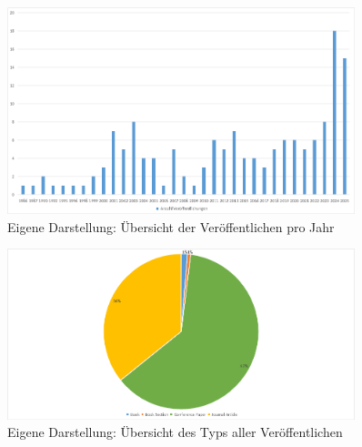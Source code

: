 \begin{figure}[htbp]
    \centering
    \includegraphics[width=0.90\textwidth]{graphics/1-veroeffentlichungen-jahr.png}
    \caption{Eigene Darstellung: Übersicht der Veröffentlichen pro Jahr}
    \label{fig:1-veroeffentlichungen-jahr}
\end{figure}

\begin{figure}[htbp]
    \centering
    \includegraphics[width=0.90\textwidth]{graphics/2-typ.png}
    \caption{Eigene Darstellung: Übersicht des Typs aller Veröffentlichen}
    \label{fig:2-typ}
\end{figure}
